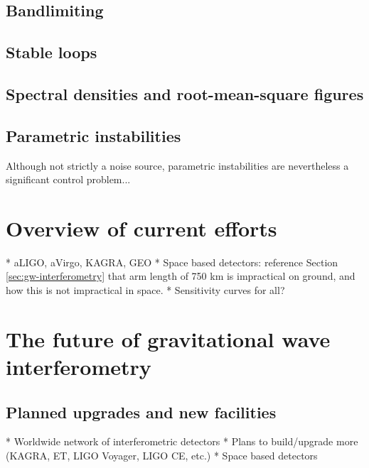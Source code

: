 \subsection{Bandlimiting}

\subsection{\label{sec:gain-phase-margin}Stable loops}

\subsection{Spectral densities and root-mean-square figures}

\subsection{Parametric instabilities}
Although not strictly a noise source, parametric instabilities are nevertheless a significant control problem...

\section{Overview of current efforts}
* aLIGO, aVirgo, KAGRA, GEO
* Space based detectors: reference Section\,\ref{sec:gw-interferometry} that arm length of 750 km is impractical on ground, and how this is not impractical in space.
* Sensitivity curves for all?

\section{The future of gravitational wave interferometry}

\subsection{Planned upgrades and new facilities}
* Worldwide network of interferometric detectors
* Plans to build/upgrade more (KAGRA, ET, LIGO Voyager, LIGO CE, etc.)
* Space based detectors

